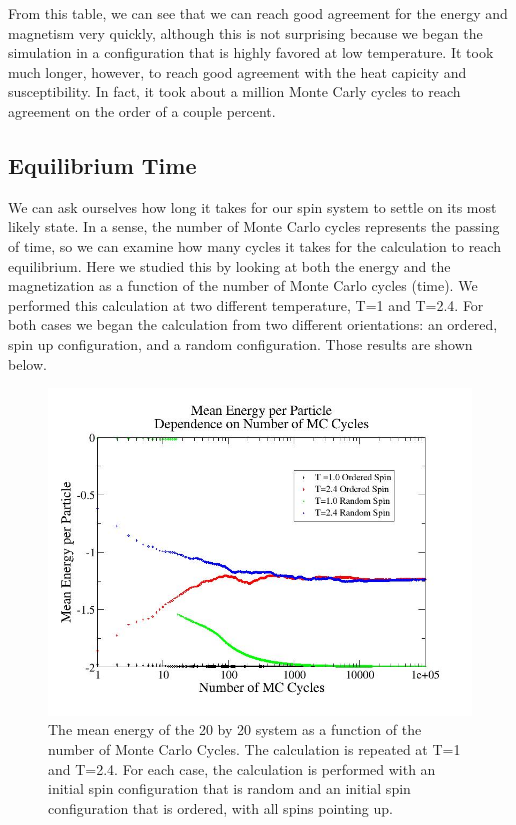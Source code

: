 \documentclass[%
oneside,                 %
final,                   %
10pt]{article}
\begin{document}
From this table, we can see that we can reach good agreement for the energy and magnetism very quickly, although this is not surprising because we began the simulation in a configuration that is highly favored at low temperature.  It took much longer, however, to reach good agreement with the heat capicity and susceptibility.  In fact, it took about a million Monte Carly cycles to reach agreement on the order of a couple percent.

\subsection{Equilibrium Time}

We can ask ourselves how long it takes for our spin system to settle on its most likely state.  In a sense, the number of Monte Carlo cycles represents the passing of time, so we can examine how many cycles it takes for the calculation to reach equilibrium.  Here we studied this by looking at both the energy and the magnetization as a function of the number of Monte Carlo cycles (time).  We performed this calculation at two different temperature, T=1 and T=2.4.  For both cases we began the calculation from two different orientations: an ordered, spin up configuration, and a random configuration.  Those results are shown below.

\begin{figure}[H]\label{fig:MCEnergy}
  \centering
    \includegraphics[width=1.1 \textwidth]{MCEnergy.jpg}
    \caption{The mean energy of the 20 by 20 system as a function of the number of Monte Carlo Cycles.  The calculation is repeated at T=1 and T=2.4.  For each case, the calculation is performed with an initial spin configuration that is random and an initial spin configuration that is ordered, with all spins pointing up.}
\end{figure}
\end{document}
